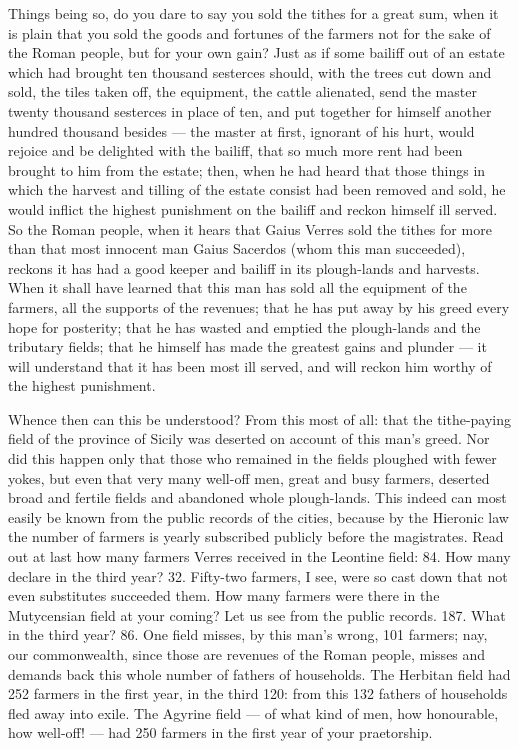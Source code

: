  Things being so, do you dare to say you sold the tithes for a great sum, when it is plain that you sold the goods and fortunes of the farmers not for the sake of the Roman people, but for your own gain? Just as if some bailiff out of an estate which had brought ten thousand sesterces should, with the trees cut down and sold, the tiles taken off, the equipment, the cattle alienated, send the master twenty thousand sesterces in place of ten, and put together for himself another hundred thousand besides --- the master at first, ignorant of his hurt, would rejoice and be delighted with the bailiff, that so much more rent had been brought to him from the estate; then, when he had heard that those things in which the harvest and tilling of the estate consist had been removed and sold, he would inflict the highest punishment on the bailiff and reckon himself ill served. So the Roman people, when it hears that Gaius Verres sold the tithes for more than that most innocent man Gaius Sacerdos (whom this man succeeded), reckons it has had a good keeper and bailiff in its plough-lands and harvests. When it shall have learned that this man has sold all the equipment of the farmers, all the supports of the revenues; that he has put away by his greed every hope for posterity; that he has wasted and emptied the plough-lands and the tributary fields; that he himself has made the greatest gains and plunder --- it will understand that it has been most ill served, and will reckon him worthy of the highest punishment.

 Whence then can this be understood? From this most of all: that the tithe-paying field of the province of Sicily was deserted on account of this man's greed. Nor did this happen only that those who remained in the fields ploughed with fewer yokes, but even that very many well-off men, great and busy farmers, deserted broad and fertile fields and abandoned whole plough-lands. This indeed can most easily be known from the public records of the cities, because by the Hieronic law the number of farmers is yearly subscribed publicly before the magistrates. Read out at last how many farmers Verres received in the Leontine field: 84. How many declare in the third year? 32. Fifty-two farmers, I see, were so cast down that not even substitutes succeeded them. How many farmers were there in the Mutycensian field at your coming? Let us see from the public records. 187. What in the third year? 86. One field misses, by this man's wrong, 101 farmers; nay, our commonwealth, since those are revenues of the Roman people, misses and demands back this whole number of fathers of households. The Herbitan field had 252 farmers in the first year, in the third 120: from this 132 fathers of households fled away into exile. The Agyrine field --- of what kind of men, how honourable, how well-off! --- had 250 farmers in the first year of your praetorship.

